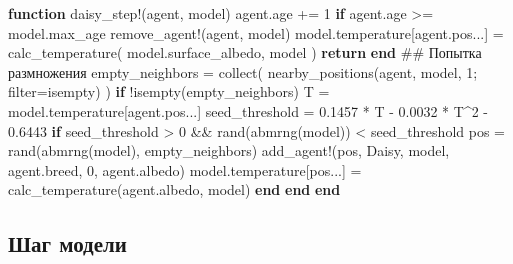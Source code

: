 \documentclass[
  12pt,
  a4paper,
  DIV=11,
  numbers=noendperiod]{scrreprt}
\newenvironment{Shaded}{\begin{snugshade}}{\end{snugshade}}
\newcommand{\CommentTok}[1]{\textcolor[rgb]{0.37,0.37,0.37}{#1}}
\newcommand{\ControlFlowTok}[1]{\textcolor[rgb]{0.00,0.23,0.31}{\textbf{#1}}}
\newcommand{\FloatTok}[1]{\textcolor[rgb]{0.68,0.00,0.00}{#1}}
\newcommand{\FunctionTok}[1]{\textcolor[rgb]{0.28,0.35,0.67}{#1}}
\newcommand{\KeywordTok}[1]{\textcolor[rgb]{0.00,0.23,0.31}{\textbf{#1}}}
\newcommand{\NormalTok}[1]{\textcolor[rgb]{0.00,0.23,0.31}{#1}}
\newcommand{\OperatorTok}[1]{\textcolor[rgb]{0.37,0.37,0.37}{#1}}
\begin{document}
\begin{Shaded}
\begin{Highlighting}[]
\KeywordTok{function} \FunctionTok{daisy\_step!}\NormalTok{(agent, model)}
\NormalTok{    agent.age }\OperatorTok{+=} \FloatTok{1}
    \ControlFlowTok{if}\NormalTok{ agent.age }\OperatorTok{\textgreater{}=}\NormalTok{ model.max\_age}
        \FunctionTok{remove\_agent!}\NormalTok{(agent, model)}
\NormalTok{        model.temperature[agent.pos}\OperatorTok{...}\NormalTok{] }\OperatorTok{=} \FunctionTok{calc\_temperature}\NormalTok{(}
\NormalTok{            model.surface\_albedo, model}
\NormalTok{        )}
        \ControlFlowTok{return}
    \ControlFlowTok{end}
    \CommentTok{\#\# Попытка размножения}
\NormalTok{    empty\_neighbors }\OperatorTok{=} \FunctionTok{collect}\NormalTok{(}
        \FunctionTok{nearby\_positions}\NormalTok{(agent, model, }\FloatTok{1}\NormalTok{; filter}\OperatorTok{=}\NormalTok{isempty)}
\NormalTok{    )}
    \ControlFlowTok{if}\NormalTok{ !}\FunctionTok{isempty}\NormalTok{(empty\_neighbors)}
\NormalTok{        T }\OperatorTok{=}\NormalTok{ model.temperature[agent.pos}\OperatorTok{...}\NormalTok{]}
\NormalTok{        seed\_threshold }\OperatorTok{=} \FloatTok{0.1457} \OperatorTok{*}\NormalTok{ T }\OperatorTok{{-}}
            \FloatTok{0.0032} \OperatorTok{*}\NormalTok{ T}\OperatorTok{\^{}}\FloatTok{2} \OperatorTok{{-}} \FloatTok{0.6443}
        \ControlFlowTok{if}\NormalTok{ seed\_threshold }\OperatorTok{\textgreater{}} \FloatTok{0} \OperatorTok{\&\&}
                \FunctionTok{rand}\NormalTok{(}\FunctionTok{abmrng}\NormalTok{(model)) }\OperatorTok{\textless{}}\NormalTok{ seed\_threshold}
\NormalTok{            pos }\OperatorTok{=} \FunctionTok{rand}\NormalTok{(}\FunctionTok{abmrng}\NormalTok{(model), empty\_neighbors)}
            \FunctionTok{add\_agent!}\NormalTok{(pos, Daisy, model,}
\NormalTok{                agent.breed, }\FloatTok{0}\NormalTok{, agent.albedo)}
\NormalTok{            model.temperature[pos}\OperatorTok{...}\NormalTok{] }\OperatorTok{=}
                \FunctionTok{calc\_temperature}\NormalTok{(agent.albedo, model)}
        \ControlFlowTok{end}
    \ControlFlowTok{end}
\KeywordTok{end}
\end{Highlighting}
\end{Shaded}

\subsection{Шаг
модели}\label{ux448ux430ux433-ux43cux43eux434ux435ux43bux438}
\end{document}
